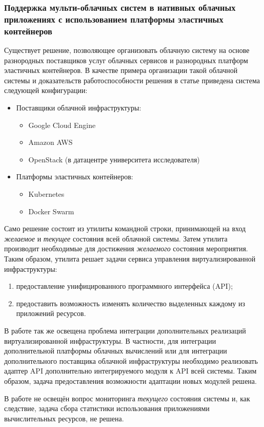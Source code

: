 \subsubsection*{Поддержка мульти-облачных систем в нативных облачных приложениях с использованием платформы эластичных контейнеров}
Существует решение\cite{smuggling}, позволяющее организовать облачную систему на основе разнородных поставщиков услуг облачных сервисов и разнородных платформ эластичных контейнеров.
В качестве примера организации такой облачной системы и доказательств работоспособности решения в статье приведена система следующей конфигурации:
\begin{itemize}
    \item Поставщики облачной инфраструктуры:
    \begin{itemize}
        \item Google Cloud Engine
        \item Amazon AWS
        \item OpenStack (в датацентре университета исследователя)
    \end{itemize}
    \item Платформы эластичных контейнеров:
    \begin{itemize}
        \item Kubernetes
        \item Docker Swarm
    \end{itemize}
\end{itemize}

Само решение состоит из утилиты командной строки, принимающей на вход \textit{желаемое} и \textit{текущее} состояния всей облачной системы. 
Затем утилита производит необходимые для достижения \textit{желаемого} состояния мероприятия.
Таким образом, утилита решает задачи сервиса управления виртуализированной инфраструктуры:
\begin{enumerate}
    \item предоставление унифицированного программного интерфейса (API);
    \item предоставить возможность изменять количество выделенных каждому из приложений ресурсов.
\end{enumerate}

В работе так же освещена проблема интеграции дополнительных реализаций виртуализированной инфраструктуры.
В частности, для интеграции дополнительной платформы облачных вычислений или для интеграции дополнительного поставщика облачной инфраструктуры необходимо реализовать адаптер API дополнительно интегрируемого модуля к API всей системы.
Таким образом, задача предоставления возможности адаптации новых модулей решена.

В работе не освещён вопрос мониторинга \textit{текущего} состояния системы и, как следствие, задача сбора статистики использования приложениями вычислительных ресурсов, не решена.